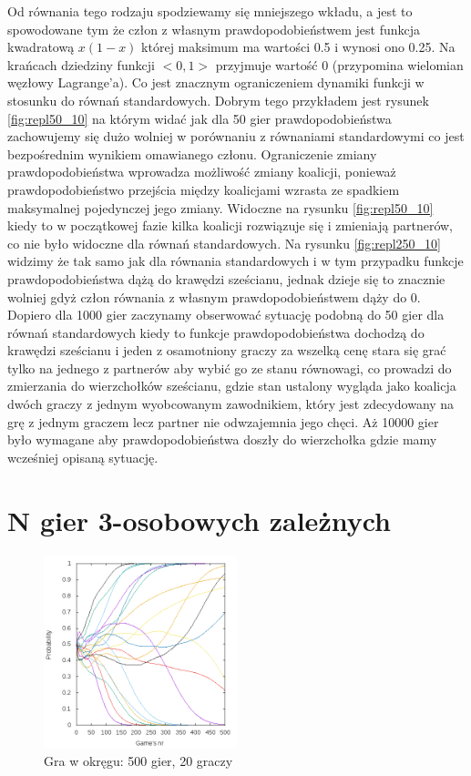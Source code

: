 Od równania tego rodzaju spodziewamy się mniejszego wkładu, a jest to spowodowane tym że człon z własnym prawdopodobieństwem jest funkcja kwadratową $x(1-x)$ której maksimum ma wartości 0.5 i wynosi ono 0.25. Na krańcach dziedziny funkcji $<0,1>$ przyjmuje wartość 0 (przypomina wielomian węzłowy Lagrange'a). Co jest znacznym ograniczeniem dynamiki funkcji w stosunku do równań standardowych. Dobrym tego przykładem jest rysunek \ref{fig:repl50_10} na którym widać jak dla 50 gier prawdopodobieństwa zachowujemy się dużo wolniej w porównaniu z równaniami standardowymi co jest bezpośrednim wynikiem omawianego członu. Ograniczenie zmiany prawdopodobieństwa wprowadza możliwość zmiany koalicji, ponieważ prawdopodobieństwo przejścia między koalicjami wzrasta ze spadkiem maksymalnej pojedynczej jego zmiany. Widoczne na rysunku \ref{fig:repl50_10} kiedy to w początkowej fazie kilka koalicji rozwiązuje się i zmieniają partnerów, co nie było widoczne dla równań standardowych. Na rysunku \ref{fig:repl250_10} widzimy że tak samo jak dla równania standardowych i w tym przypadku funkcje prawdopodobieństwa dążą do krawędzi sześcianu, jednak dzieje się to znacznie wolniej gdyż człon równania z własnym prawdopodobieństwem dąży do 0. Dopiero dla 1000 gier zaczynamy obserwować sytuację podobną do 50 gier dla równań standardowych kiedy to funkcje prawdopodobieństwa dochodzą do krawędzi sześcianu i jeden z osamotniony graczy za wszelką cenę stara się grać tylko na jednego z partnerów aby wybić go ze stanu równowagi, co prowadzi do zmierzania do wierzchołków sześcianu, gdzie stan ustalony wygląda jako koalicja dwóch graczy z jednym wyobcowanym zawodnikiem, który jest zdecydowany na grę z jednym graczem lecz partner nie odwzajemnia jego chęci. Aż 10000 gier było wymagane aby prawdopodobieństwa doszły do wierzchołka gdzie mamy wcześniej opisaną sytuację.

\section{N gier 3-osobowych zależnych}
\label{sec:N3zal}
\begin{figure}
    \centering
    \includegraphics[width=0.5\textwidth]{pict/wyniki/g500p20}   
    \caption{Gra w okręgu: 500 gier, 20 graczy}
	\label{fig:podst} 
\end{figure}


